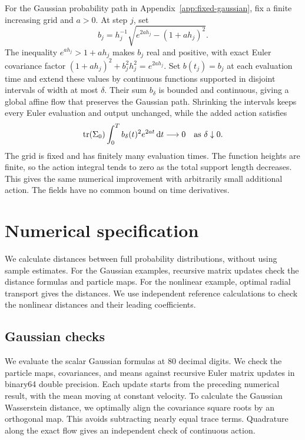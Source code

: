 For the Gaussian probability path in Appendix~\ref{app:fixed-gaussian}, fix a finite increasing grid and $a>0$. At step $j$, set
\[
 b_j=h_j^{-1}\sqrt{e^{2ah_j}-(1+ah_j)^2}.
\]
The inequality $e^{ah_j}>1+ah_j$ makes $b_j$ real and positive, with exact Euler covariance factor $(1+ah_j)^2+b_j^2h_j^2=e^{2ah_j}$. Set $b(t_j)=b_j$ at each evaluation time and extend these values by continuous functions supported in disjoint intervals of width at most $\delta$. Their sum $b_\delta$ is bounded and continuous, giving a global affine flow that preserves the Gaussian path. Shrinking the intervals keeps every Euler evaluation and output unchanged, while the added action satisfies
\[
 \operatorname{tr}(\Sigma_0)\int_0^T b_\delta(t)^2e^{2at}\,\mathrm d t\longrightarrow0
 \quad\text{as }\delta\downarrow0.
\]
The grid is fixed and has finitely many evaluation times. The function heights are finite, so the action integral tends to zero as the total support length decreases. This gives the same numerical improvement with arbitrarily small additional action. The fields have no common bound on time derivatives.

\section{Numerical specification}
\label{app:numerics}

We calculate distances between full probability distributions, without using sample estimates. For the Gaussian examples, recursive matrix updates check the distance formulas and particle maps. For the nonlinear example, optimal radial transport gives the distances. We use independent reference calculations to check the nonlinear distances and their leading coefficients.

\subsection{Gaussian checks}

We evaluate the scalar Gaussian formulas at 80 decimal digits. We check the particle maps, covariances, and means against recursive Euler matrix updates in binary64 double precision. Each update starts from the preceding numerical result, with the mean moving at constant velocity. To calculate the Gaussian Wasserstein distance, we optimally align the covariance square roots by an orthogonal map. This avoids subtracting nearly equal trace terms. Quadrature along the exact flow gives an independent check of continuous action.

